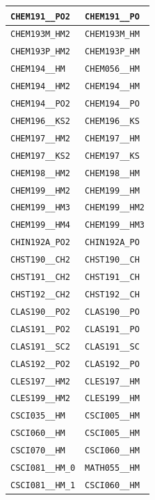 \begin{longtable}{|p{4.4in}|p{4.4in}|}
    \verb|CHEM191__PO2| & \verb|CHEM191__PO|\\\hline
    \verb|CHEM193M_HM2| & \verb|CHEM193M_HM|\\\hline
    \verb|CHEM193P_HM2| & \verb|CHEM193P_HM|\\\hline
    \verb|CHEM194__HM| & \verb|CHEM056__HM|\\\hline
    \verb|CHEM194__HM2| & \verb|CHEM194__HM|\\\hline
    \verb|CHEM194__PO2| & \verb|CHEM194__PO|\\\hline
    \verb|CHEM196__KS2| & \verb|CHEM196__KS|\\\hline
    \verb|CHEM197__HM2| & \verb|CHEM197__HM|\\\hline
    \verb|CHEM197__KS2| & \verb|CHEM197__KS|\\\hline
    \verb|CHEM198__HM2| & \verb|CHEM198__HM|\\\hline
    \verb|CHEM199__HM2| & \verb|CHEM199__HM|\\\hline
    \verb|CHEM199__HM3| & \verb|CHEM199__HM2|\\\hline
    \verb|CHEM199__HM4| & \verb|CHEM199__HM3|\\\hline
    \verb|CHIN192A_PO2| & \verb|CHIN192A_PO|\\\hline
    \verb|CHST190__CH2| & \verb|CHST190__CH|\\\hline
    \verb|CHST191__CH2| & \verb|CHST191__CH|\\\hline
    \verb|CHST192__CH2| & \verb|CHST192__CH|\\\hline
    \verb|CLAS190__PO2| & \verb|CLAS190__PO|\\\hline
    \verb|CLAS191__PO2| & \verb|CLAS191__PO|\\\hline
    \verb|CLAS191__SC2| & \verb|CLAS191__SC|\\\hline
    \verb|CLAS192__PO2| & \verb|CLAS192__PO|\\\hline
    \verb|CLES197__HM2| & \verb|CLES197__HM|\\\hline
    \verb|CLES199__HM2| & \verb|CLES199__HM|\\\hline
    \verb|CSCI035__HM| & \verb|CSCI005__HM|\\\hline
    \verb|CSCI060__HM| & \verb|CSCI005__HM|\\\hline
    \verb|CSCI070__HM| & \verb|CSCI060__HM|\\\hline
    \verb|CSCI081__HM_0| & \verb|MATH055__HM|\\\hline
    \verb|CSCI081__HM_1| & \verb|CSCI060__HM|\\\hline

\end{longtable}

